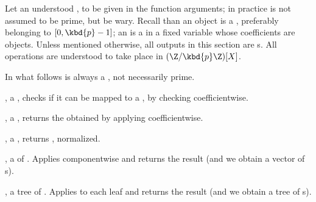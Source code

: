 











 Let  an understood , to be given in
the function arguments; in practice  is not assumed to be prime, but
be wary. Recall than an  object is a , preferably belonging
to $[0, \kbd{p}-1]$; an  is a  in a fixed variable whose
coefficients are  objects. Unless mentioned otherwise, all outputs in
this section are s. All operations are understood to take place in
$(\Z/\kbd{p}\Z)[X]$.

 In what follows  is always a ,
not necessarily prime.

,  a ,
checks if it can be mapped to a , by checking 
coefficientwise.

,  a , returns the
 obtained by applying  coefficientwise.

,  a , returns , normalized.

,  a  of . Applies
 componentwise and returns the result (and we obtain a vector
of s).

,  a tree of . Applies
 to each leaf and returns the result (and we obtain a tree
of s).

